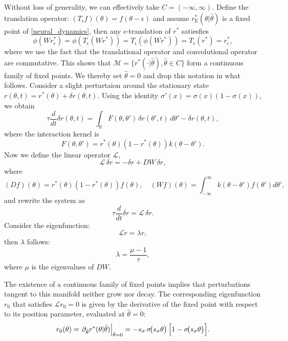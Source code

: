 \documentclass{article}
\newcommand{\rE}{r_{\text{E}}}
\newcommand{\thetah}{\hat{\theta}}
\begin{document}
Without loss of generality, we can effectively take $C= (-\infty, \infty)$. Define the translation operator: $(T_\epsilon f)(\theta) = f(\theta-\epsilon)$ and assume $\rE^*(\theta|\thetah)$ is a fixed point of \eqref{neural_dynamics}, then any $\epsilon$-translation of $r^*$ satiesfies
\begin{equation}
    \phi(W r^*_\epsilon) = \phi(T_\epsilon(W r^*)) = T_\epsilon(\phi(W r^*)) = T_\epsilon(r^*) = r^*_{\epsilon},
\end{equation}
where we use the fact that the translational operator and convolutional operator are commutative. This shows that $\mathcal{M}=\{r^*(\cdot|\thetah), \thetah \in C\}$ form a continuous family of fixed points. We thereby set $\thetah=0$ and drop this notation in what follows. Consider a slight perturtaion around the stationary state $r(\theta,t) = r^*(\theta) + \delta r(\theta, t)$. Using the identity $\sigma'(x)=\sigma(x)(1-\sigma(x))$, we obtain
\begin{equation}
    \tau \frac{d}{dt} \delta r(\theta,t) = \int_{\mathbb{R}} F(\theta,\theta')\,\delta r(\theta',t)\,d\theta' - \delta r(\theta,t),
\end{equation}
where the interaction kernel is
\begin{equation}
F(\theta,\theta')=r^*(\theta)\left(1-r^*(\theta)\right)k(\theta-\theta').
\end{equation}
Now we define the linear operator $\mathcal{L}$,
\begin{equation}
    \mathcal{L}\,\delta r  = - \delta r + D W\,\delta r,
\end{equation}
where
\begin{equation}
    (D f)(\theta) = r^*(\theta)\left(1-r^*(\theta)\right)f(\theta), \quad (W f)(\theta) =\int_{-\infty}^{\infty} k(\theta-\theta') f(\theta')d\theta',
\end{equation}
and rewrite the system as
\begin{equation}
    \tau \frac{d}{dt} \delta r = \mathcal{L}\, \delta r.
\end{equation}
Consider the eigenfunction:
\begin{equation}
    \mathcal{L}r = \lambda r,
\end{equation}
then $\lambda$ follows:
\begin{equation}
    \lambda = \frac{\mu-1}{\tau},
\end{equation} 
where $\mu$ is the eigenvalues of $D W$.

The existence of a continuous family of fixed points implies that perturbations tangent to this manifold neither grow nor decay. The corresponding eigenfunction $r_0$ that satisfies $\mathcal{L} r_0 = 0$ is given by the derivative of the fixed point with respect to its position parameter, evaluated at $\thetah=0$:
\begin{equation}
    r_0(\theta)=\left.\partial_{\thetah} r^*(\theta|\thetah)\right|_{\thetah=0}
    = -s_{\sigma}\,\sigma\!\bigl(s_{\sigma}\theta\bigr)\,\Bigl[1-\sigma\!\bigl(s_{\sigma}\theta\bigr)\Bigr].
\end{equation}
\end{document}
